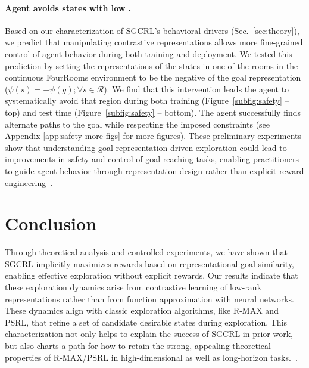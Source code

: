 \documentclass{article}
\begin{document}
    


\paragraph{Agent avoids states with low \psisim.} Based on our characterization of SGCRL's behavioral drivers (Sec.~\ref{sec:theory}), we predict that manipulating contrastive representations allows more fine-grained control of agent behavior during both training and deployment. We tested this prediction by setting the representations of the states in one of the rooms in the continuous FourRooms environment to be the negative of the goal representation ($\psi(s) = -\psi(g) ;\forall s \in \mathcal{R}$). We find that this intervention leads the agent to systematically avoid that region during both training (Figure~\ref{subfig:safety} -- top) and test time (Figure~\ref{subfig:safety} -- bottom). The agent successfully finds alternate paths to the goal while respecting the imposed constraints (see Appendix \ref{app:safety-more-figs} for more figures). These preliminary experiments show that understanding goal representation-driven exploration could lead to improvements in safety and control of goal-reaching tasks, enabling practitioners to guide agent behavior through representation design rather than explicit reward engineering~\citep{ibrahim2024comprehensive}.































\section{Conclusion}
Through theoretical analysis and controlled experiments, we have shown that SGCRL implicitly maximizes rewards based on representational goal-similarity, enabling effective exploration without explicit rewards. Our results indicate that these exploration dynamics arise from contrastive learning of low-rank representations rather than from function approximation with neural networks. These dynamics align with classic exploration algorithms, like R-MAX and PSRL, that refine a set of candidate desirable states during exploration. This characterization not only helps to explain the success of SGCRL in prior work, but also charts a path for how to retain the strong, appealing theoretical properties of R-MAX/PSRL in high-dimensional as well as long-horizon tasks.~\citep{liu2025a, eysenbach2022contrastive, zheng2023stabilizing}.
\end{document}
